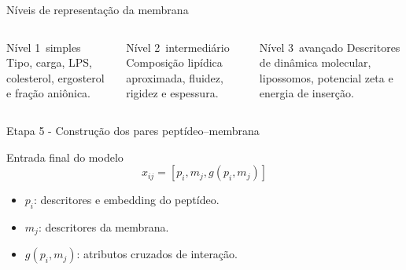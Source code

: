 \documentclass[aspectratio=169,10pt]{beamer}
\begin{document}
\begin{frame}{Níveis de representação da membrana}
\begin{columns}[T]
\begin{block}{Nível 1\ simples}
\small
Tipo, carga, LPS, colesterol, ergosterol e fração aniônica.
\end{block}

\begin{block}{Nível 2\ intermediário}
\small
Composição lipídica aproximada, fluidez, rigidez e espessura.
\end{block}

\begin{block}{Nível 3\ avançado}
\small
Descritores de dinâmica molecular, lipossomos, potencial zeta e energia de inserção.
\end{block}
\end{columns}

\vspace{0.5cm}
\begin{center}
\end{center}
\end{frame}

\begin{frame}{Etapa 5 - Construção dos pares peptídeo--membrana}
\begin{block}{Entrada final do modelo}
\begin{equation*}
  x_{ij} = [p_i, m_j, g(p_i,m_j)]
\end{equation*}
\end{block}

\begin{itemize}
  \item $p_i$: descritores e embedding do peptídeo.
  \item $m_j$: descritores da membrana.
  \item $g(p_i,m_j)$: atributos cruzados de interação.
\end{itemize}

\vspace{0.2cm}
\begin{center}
\end{center}
\end{frame}
\end{document}
